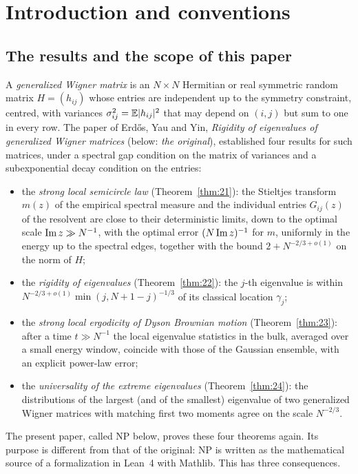 \section{Introduction and conventions}\label{sec:intro}

\subsection{The results and the scope of this paper}
A \emph{generalized Wigner matrix} is an $N\times N$ Hermitian or real symmetric random matrix $H=(h_{ij})$ whose entries are independent up to the symmetry
constraint, centred, with variances $\sigma_{ij}^2=\mathbb{E}|h_{ij}|^2$ that may depend on $(i,j)$ but sum to one in every row. The paper
of Erd\H{o}s, Yau and Yin, \emph{Rigidity of eigenvalues of generalized Wigner matrices} (below: \emph{the original}), established four results for such
matrices, under a spectral gap condition on the matrix of variances and a subexponential decay condition on the entries:
\begin{itemize}[leftmargin=2em,itemsep=1pt]
\item the \emph{strong local semicircle law} (Theorem~\ref{thm:21}): the Stieltjes transform $m(z)$ of the empirical spectral measure and the individual entries $G_{ij}(z)$
of the resolvent are close to their deterministic limits, down to the optimal scale $\operatorname{Im} z\gg N^{-1}$, with the optimal error $(N\operatorname{Im} z)^{-1}$ for $m$, uniformly in
the energy up to the spectral edges, together with the bound $2+N^{-2/3+o(1)}$ on the norm of $H$;
\item the \emph{rigidity of eigenvalues} (Theorem~\ref{thm:22}): the $j$-th eigenvalue is within $N^{-2/3+o(1)}\min(j,N+1-j)^{-1/3}$ of its classical location $\gamma_j$;
\item the \emph{strong local ergodicity of Dyson Brownian motion} (Theorem~\ref{thm:23}): after a time $t\gg N^{-1}$ the local eigenvalue statistics in the bulk, averaged over a small
energy window, coincide with those of the Gaussian ensemble, with an explicit power-law error;
\item the \emph{universality of the extreme eigenvalues} (Theorem~\ref{thm:24}): the distributions of the largest (and of the smallest) eigenvalue of two generalized Wigner
matrices with matching first two moments agree on the scale $N^{-2/3}$.
\end{itemize}
The present paper, called NP below, proves these four theorems again. Its purpose is different from that of the original: NP is written as the mathematical
source of a formalization in Lean~4 with Mathlib. This has three consequences.

